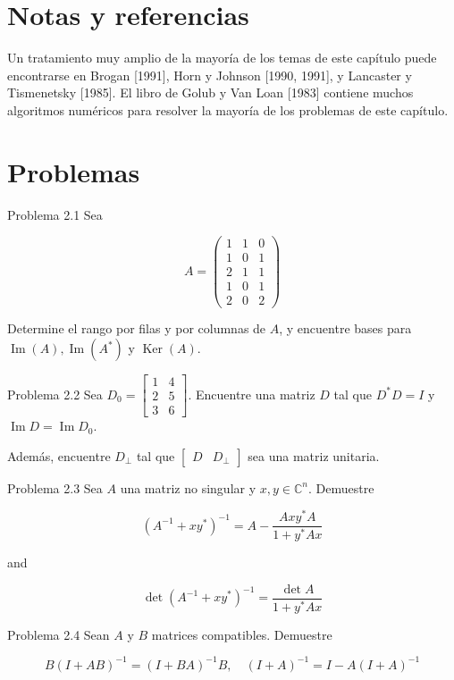 \section{Notas y referencias}
Un tratamiento muy amplio de la mayoría de los temas de este capítulo puede encontrarse en Brogan [1991], Horn y Johnson [1990, 1991], y Lancaster y Tismenetsky [1985]. El libro de Golub y Van Loan [1983] contiene muchos algoritmos numéricos para resolver la mayoría de los problemas de este capítulo.

\section{Problemas}
Problema 2.1 Sea

$$
A=\left(\begin{array}{lll}
1 & 1 & 0 \\
1 & 0 & 1 \\
2 & 1 & 1 \\
1 & 0 & 1 \\
2 & 0 & 2
\end{array}\right)
$$

Determine el rango por filas y por columnas de $A$, y encuentre bases para $\operatorname{Im}(A), \operatorname{Im}\left(A^{*}\right)$ y $\operatorname{Ker}(A)$.

Problema 2.2 Sea $D_{0}=\left[\begin{array}{ll}1 & 4 \\ 2 & 5 \\ 3 & 6\end{array}\right]$. Encuentre una matriz $D$ tal que $D^{*} D=I$ y $\operatorname{Im} D=\operatorname{Im} D_{0}$.

Además, encuentre $D_{\perp}$ tal que $\left[\begin{array}{cc}D & D_{\perp}\end{array}\right]$ sea una matriz unitaria.

Problema 2.3 Sea $A$ una matriz no singular y $x, y \in \mathbb{C}^{n}$. Demuestre

$$
\left(A^{-1}+x y^{*}\right)^{-1}=A-\frac{A x y^{*} A}{1+y^{*} A x}
$$

and

$$
\operatorname{det}\left(A^{-1}+x y^{*}\right)^{-1}=\frac{\operatorname{det} A}{1+y^{*} A x}
$$

Problema 2.4 Sean $A$ y $B$ matrices compatibles. Demuestre

$$
B(I+A B)^{-1}=(I+B A)^{-1} B, \quad(I+A)^{-1}=I-A(I+A)^{-1}
$$

